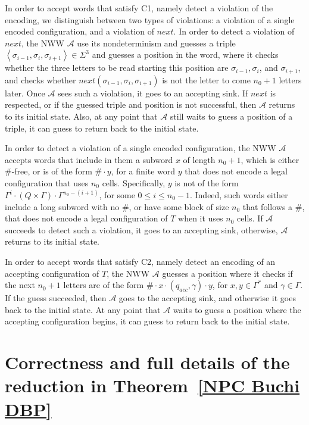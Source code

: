 \documentclass[10pt,a4paper]{amsart}
\theoremstyle{definition}
\numberwithin{equation}{section}
\newcommand{\A}{{\mathcal A}}
\newcommand{\zug}[1]{\left\langle #1 \right\rangle}
\begin{document}
In order to accept words that satisfy C1, namely detect a violation of the encoding, we distinguish between two types of violations: a violation of a single encoded configuration, and a violation of $next$. 
In order to detect a violation of $next$, the NWW $\A$ use its
nondeterminism and guesses a triple $\zug{\sigma_{i-1},\sigma_i,\sigma_{i+1}} \in \Sigma^3$ and guesses a position in the word, where it checks whether the three letters
to be read starting this position are $\sigma_{i-1},\sigma_i$, and
$\sigma_{i+1}$, and checks whether
$next(\sigma_{i-1},\sigma_i,\sigma_{i+1})$ is not the
letter to come $n_0+1$ letters later.
Once $\A$ sees such a violation, it goes to an accepting sink. If $next$ is respected, 
or if the guessed triple and position is not successful, then $\A$ returns to its initial state. Also, at any point that $\A$ still waits to guess a position of a triple, it can guess to return back to the initial state.

In order to detect a violation of a single encoded configuration, the NWW $\A$ accepts words that include in them a subword $x$ of length $n_0+1$, which is either $\#$-free, or is of the form $\#\cdot y$, for a finite word $y$ that does not encode a legal configuration that uses $n_0$ cells. Specifically, $y$ is not of the form $\Gamma^i \cdot (Q\times \Gamma) \cdot \Gamma^{n_0-(i+1)}$, for some $0 \leq i \leq n_0-1$.
Indeed, such words either include a long subword with no $\#$, 
or have some block of size $n_0$ that follows a $\#$, that does not encode a legal configuration of $T$ when it uses $n_0$ cells. 
If $\A$ succeeds to detect such a violation, it goes to an accepting sink, otherwise, $\A$ returns to its initial state.	
	
	

In order to accept words that satisfy C2, namely detect an encoding of an accepting configuration of $T$, the NWW $\A$ guesses a position where it checks if the next $n_0+1$ letters are of the form $\# \cdot x\cdot (q_{acc},\gamma)\cdot y$, for $x,y\in \Gamma^*$ and $\gamma\in \Gamma$. 
If the guess succeeded, then $\A$ goes to the accepting sink, and otherwise it goes back to the initial state. At any point that $\A$ waits to guess a position where the accepting configuration begins, it can guess to return back to the initial state.


\section{Correctness and full details of the reduction in Theorem~\ref{NPC Buchi DBP}}
\label{app np HDnbw}
\end{document}
